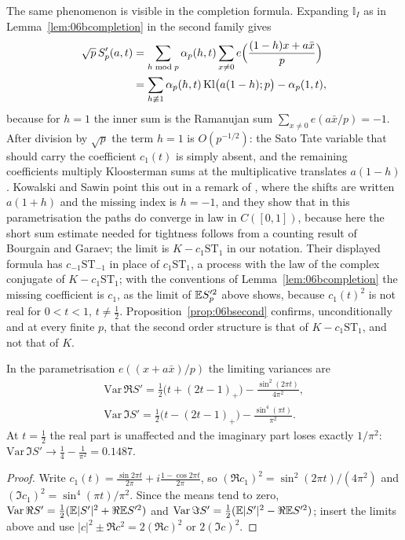 The same phenomenon is visible in the completion formula. Expanding $\mathbb{I}_I$ as in Lemma~\ref{lem:06bcompletion} in the second family gives
\begin{align*}
\sqrt p\,S'_p(a,t)&=\sum_{h\bmod p}\alpha_p(h,t)\sum_{x\ne0}e\Bigl(\frac{(1-h)x+a\bar x}{p}\Bigr)\\
&=\sum_{h\not\equiv1}\alpha_p(h,t)\,\mathrm{Kl}\bigl(a(1-h);p\bigr)-\alpha_p(1,t),
\end{align*}
because for $h=1$ the inner sum is the Ramanujan sum $\sum_{x\ne0}e(a\bar x/p)=-1$. After division by $\sqrt p$ the term $h=1$ is $O(p^{-1/2})$: the Sato Tate variable that should carry the coefficient $c_1(t)$ is simply absent, and the remaining coefficients multiply Kloosterman sums at the multiplicative translates $a(1-h)$. Kowalski and Sawin point this out in a remark of \cite{kowalskisawin2016}, where the shifts are written $a(1+h)$ and the missing index is $h=-1$, and they show that in this parametrisation the paths do converge in law in $C([0,1])$, because here the short sum estimate needed for tightness follows from a counting result of Bourgain and Garaev; the limit is $K-c_1\mathrm{ST}_1$ in our notation. Their displayed formula has $c_{-1}\mathrm{ST}_{-1}$ in place of $c_1\mathrm{ST}_1$, a process with the law of the complex conjugate of $K-c_1\mathrm{ST}_1$; with the conventions of Lemma~\ref{lem:06bcompletion} the missing coefficient is $c_1$, as the limit of $\mathbb{E} S_p'^2$ above shows, because $c_1(t)^2$ is not real for $0<t<1$, $t\ne\frac12$. Proposition~\ref{prop:06bsecond} confirms, unconditionally and at every finite $p$, that the second order structure is that of $K-c_1\mathrm{ST}_1$, and not that of $K$.

\begin{corollary}\label{cor:06bdeficit}
In the parametrisation $e((x+a\bar x)/p)$ the limiting variances are
\begin{gather*}
\mathrm{Var}\,\Re S'=\tfrac12\bigl(t+(2t-1)_+\bigr)-\frac{\sin^2(2\pi t)}{4\pi^2},\\
\mathrm{Var}\,\Im S'=\tfrac12\bigl(t-(2t-1)_+\bigr)-\frac{\sin^4(\pi t)}{\pi^2}.
\end{gather*}
At $t=\frac12$ the real part is unaffected and the imaginary part loses exactly $1/\pi^2$: $\mathrm{Var}\,\Im S'\to\frac14-\frac1{\pi^2}=0.1487$.
\end{corollary}

\begin{proof}
Write $c_1(t)=\frac{\sin2\pi t}{2\pi}+i\frac{1-\cos2\pi t}{2\pi}$, so $(\Re c_1)^2=\sin^2(2\pi t)/(4\pi^2)$ and $(\Im c_1)^2=\sin^4(\pi t)/\pi^2$. Since the means tend to zero, $\mathrm{Var}\,\Re S'=\frac12(\mathbb{E}|S'|^2+\Re\mathbb{E} S'^2)$ and $\mathrm{Var}\,\Im S'=\frac12(\mathbb{E}|S'|^2-\Re\mathbb{E} S'^2)$; insert the limits above and use $|c|^2\pm\Re c^2=2(\Re c)^2$ or $2(\Im c)^2$.
\end{proof}


